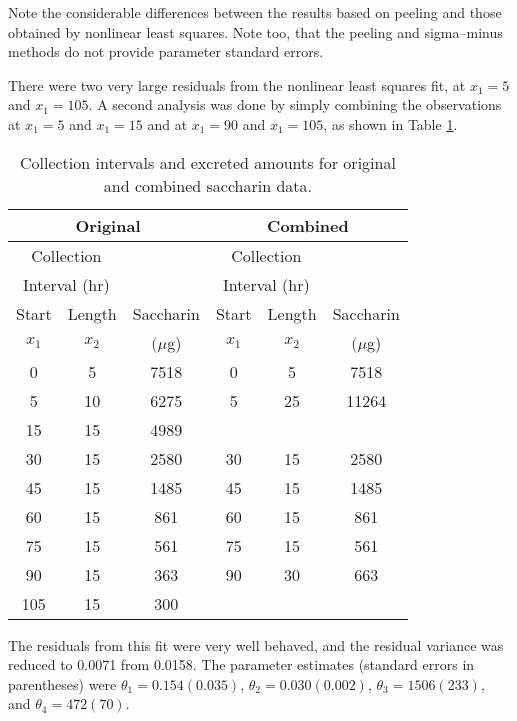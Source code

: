 \begin{example}
Note the considerable differences between the results based on
peeling and those obtained by nonlinear least squares.
Note too, that the peeling and sigma--minus methods do not
provide parameter standard errors.

There were two very large residuals from the nonlinear least
squares fit, at $x_1=5$ and $x_1=105$.
A second analysis was done by simply combining the observations
at $x_1=5$ and  $x_1=15$ and at
$x_1=90$ and $x_1=105$, as shown in Table \ref{tbl:SACHed}.
\begin{table}
  \caption{
  Collection intervals and excreted amounts for original and
  combined saccharin data.  }\label{tbl:SACHed}
  \begin{center}
    \begin{tabular}{cccccc} \hline
      \multicolumn{3}{c}{Original} & \multicolumn{3}{c}{Combined}\\
      \hline \multicolumn{2}{c}{Collection} & &
      \multicolumn{2}{c}{Collection} &\\ \multicolumn{2}{c}{Interval (hr)}
      & & \multicolumn{2}{c}{Interval (hr)} & \\ \multicolumn{1}{c}{Start}
      & \multicolumn{1}{c}{Length} & \multicolumn{1}{c}{Saccharin} &
      \multicolumn{1}{c}{Start} & \multicolumn{1}{c}{Length} &
      \multicolumn{1}{c}{Saccharin}\\ \multicolumn{1}{c}{$x_{1}$} &
      \multicolumn{1}{c}{$x_{2}$} & \multicolumn{1}{c}{$(\mu$g)} &
      \multicolumn{1}{c}{$x_{1}$} & \multicolumn{1}{c}{$x_{2}$} &
      \multicolumn{1}{c}{$(\mu$g)}\\ \hline 0&5&7518&0&5&7518\\
      5&10&6275&5&25&11264\\ 15&15&4989&\\ 30&15&2580&30&15&2580\\
      45&15&1485&45&15&1485\\ 60&15&861&60&15&861\\ 75&15&561&75&15&561\\
      90&15&363&90&30&663\\ 105&15&300\\ \hline
    \end{tabular}
  \end{center}
\end{table}
 
The residuals from this fit were very well behaved, and the
residual variance was reduced to 0.0071 from 0.0158.
The parameter estimates (standard errors in parentheses) were
$\theta_1 = 0.154 (0.035)$,
$\theta_2 = 0.030 (0.002)$,
$\theta_3 = 1506  (233)$, and
$\theta_4 =  472 (70)$.
\end{example}

